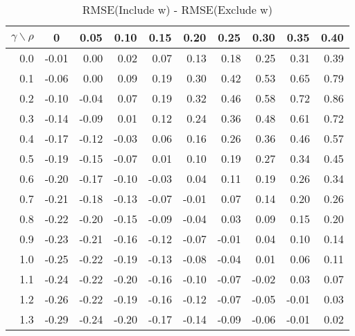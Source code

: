 \documentclass[12pt]{article}
\begin{document}
%
\begin{table}[!tbp]
\caption{RMSE(Include w) - RMSE(Exclude w)}
 \begin{center}
 \begin{tabular}{r|rrrrrrrrr}\hline\hline
\multicolumn{1}{c|}{$\gamma\backslash\rho$}&\multicolumn{1}{c}{0}&\multicolumn{1}{c}{0.05}&\multicolumn{1}{c}{0.10}&\multicolumn{1}{c}{0.15}&\multicolumn{1}{c}{0.20}&\multicolumn{1}{c}{0.25}&\multicolumn{1}{c}{0.30}&\multicolumn{1}{c}{0.35}&\multicolumn{1}{c}{0.40}\tabularnewline
\hline
0.0&-0.01& 0.00& 0.02& 0.07& 0.13& 0.18& 0.25& 0.31&0.39\tabularnewline
0.1&-0.06& 0.00& 0.09& 0.19& 0.30& 0.42& 0.53& 0.65&0.79\tabularnewline
0.2&-0.10&-0.04& 0.07& 0.19& 0.32& 0.46& 0.58& 0.72&0.86\tabularnewline
0.3&-0.14&-0.09& 0.01& 0.12& 0.24& 0.36& 0.48& 0.61&0.72\tabularnewline
0.4&-0.17&-0.12&-0.03& 0.06& 0.16& 0.26& 0.36& 0.46&0.57\tabularnewline
0.5&-0.19&-0.15&-0.07& 0.01& 0.10& 0.19& 0.27& 0.34&0.45\tabularnewline
0.6&-0.20&-0.17&-0.10&-0.03& 0.04& 0.11& 0.19& 0.26&0.34\tabularnewline
0.7&-0.21&-0.18&-0.13&-0.07&-0.01& 0.07& 0.14& 0.20&0.26\tabularnewline
0.8&-0.22&-0.20&-0.15&-0.09&-0.04& 0.03& 0.09& 0.15&0.20\tabularnewline
0.9&-0.23&-0.21&-0.16&-0.12&-0.07&-0.01& 0.04& 0.10&0.14\tabularnewline
1.0&-0.25&-0.22&-0.19&-0.13&-0.08&-0.04& 0.01& 0.06&0.11\tabularnewline
1.1&-0.24&-0.22&-0.20&-0.16&-0.10&-0.07&-0.02& 0.03&0.07\tabularnewline
1.2&-0.26&-0.22&-0.19&-0.16&-0.12&-0.07&-0.05&-0.01&0.03\tabularnewline
1.3&-0.29&-0.24&-0.20&-0.17&-0.14&-0.09&-0.06&-0.01&0.02\tabularnewline
\hline
\end{tabular}

\end{center}

\end{table}
\end{document}
